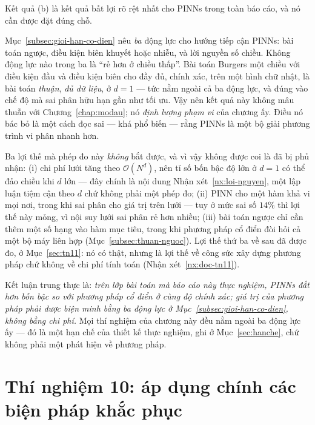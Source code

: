 \begin{nhanxet}
\label{nx:doc-tn9}
Kết quả (b) là kết quả bất lợi rõ rệt nhất cho PINNs trong toàn báo cáo, và nó
cần được đặt đúng chỗ.

Mục~\ref{subsec:gioi-han-co-dien} nêu \emph{ba} động lực cho hướng tiếp cận PINNs: bài
toán ngược, điều kiện biên khuyết hoặc nhiễu, và lời nguyền số chiều. Không động
lực nào trong ba là ``rẻ hơn ở chiều thấp''. Bài toán Burgers một chiều với điều
kiện đầu và điều kiện biên cho đầy đủ, chính xác, trên một hình chữ nhật, là bài
toán \emph{thuận}, \emph{đủ dữ liệu}, ở $d = 1$ --- tức nằm ngoài cả ba động
lực, và đúng vào chế độ mà sai phân hữu hạn gần như tối ưu. Vậy nên kết quả này
không mâu thuẫn với Chương~\ref{chap:modau}; nó \emph{định lượng phạm vi} của
chương ấy. Điều nó bác bỏ là một cách đọc sai --- khá phổ biến --- rằng PINNs là
một bộ giải phương trình vi phân nhanh hơn.

Ba lợi thế mà phép đo này \emph{không} bắt được, và vì vậy không được coi là đã
bị phủ nhận: (i) chi phí lưới tăng theo $\mathcal{O}(N^d)$, nên tỉ số bốn bậc
độ lớn ở $d=1$ có thể đảo chiều khi $d$ lớn --- đây chính là nội dung
Nhận xét~\ref{nx:loi-nguyen}, một lập luận tiệm cận theo $d$ chứ không phải một
phép đo; (ii) PINN cho một hàm khả vi mọi nơi, trong khi sai phân cho giá trị
trên lưới --- tuy ở mức sai số $14\%$ thì lợi thế này mỏng, vì nội suy lưới sai
phân rẻ hơn nhiều; (iii) bài toán ngược chỉ cần thêm một số hạng vào hàm mục
tiêu, trong khi phương pháp cổ điển đòi hỏi cả một bộ máy liên hợp
(Mục~\ref{subsec:thuan-nguoc}). Lợi thế thứ ba về sau đã được đo, ở
Mục~\ref{sec:tn11}: nó có thật, nhưng là lợi thế về công sức xây dựng phương pháp
chứ không về chi phí tính toán (Nhận xét~\ref{nx:doc-tn11}).

Kết luận trung thực là: \emph{trên lớp bài toán mà báo cáo này thực nghiệm,
PINNs đắt hơn bốn bậc so với phương pháp cổ điển ở cùng độ chính xác; giá trị
của phương pháp phải được biện minh bằng ba động lực ở
Mục~\ref{subsec:gioi-han-co-dien}, không bằng chi phí.} Mọi thí nghiệm của chương này
đều nằm ngoài ba động lực ấy --- đó là một hạn chế của thiết kế thực nghiệm, ghi
ở Mục~\ref{sec:hanche}, chứ không phải một phát hiện về phương pháp.
\end{nhanxet}

\section{Thí nghiệm 10: áp dụng chính các biện pháp khắc phục}
\label{sec:tn10}

